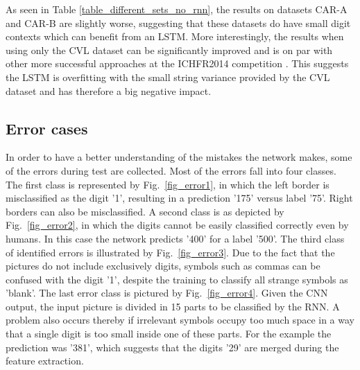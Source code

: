 As seen in Table \ref{table_different_sets_no_rnn}, the results on datasets
CAR-A and CAR-B are slightly worse, suggesting that these datasets do have small
digit contexts which can benefit from an LSTM. More interestingly, the results
when using only the CVL dataset can be significantly improved and is on par with
other more successful approaches at the ICHFR2014 competition
\cite{icfhr_competition}. This suggests the LSTM is overfitting with the small
string variance provided by the CVL dataset and has therefore a big negative
impact. 

\subsection{Error cases}

In order to have a better understanding of the mistakes the network makes, some
of the errors during test are collected. Most of the errors fall into four
classes. The first class is represented by Fig.~\ref{fig_error1}, in which the
left border is misclassified as the digit '1', resulting in a prediction '175'
versus label '75'. Right borders can also be misclassified. A second class is as
depicted by Fig.~\ref{fig_error2}, in which the digits cannot be easily
classified correctly even by humans. In this case the network predicts '400' for
a label '500'. The third class of identified errors is illustrated by
Fig.~\ref{fig_error3}. Due to the fact that the pictures do not include
exclusively digits, symbols such as commas can be confused with the digit '1',
despite the training to classify all strange symbols as 'blank'. The last error
class is pictured by Fig.~\ref{fig_error4}. Given the CNN output, the input
picture is divided in 15 parts to be classified by the RNN. A problem also
occurs thereby if irrelevant symbols occupy too much space in a way that a
single digit is too small inside one of these parts. For the example the
prediction was '381', which suggests that the digits '29' are merged during the
feature extraction. 

